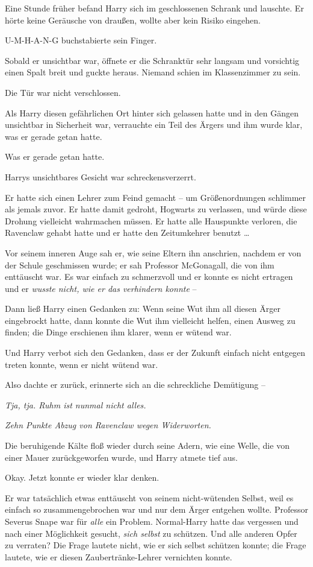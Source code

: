 Eine Stunde früher befand Harry sich im geschlossenen Schrank und lauschte. Er hörte keine Geräusche von draußen, wollte aber kein Risiko eingehen. 

U-M-H-A-N-G buchstabierte sein Finger. 

Sobald er unsichtbar war, öffnete er die Schranktür sehr langsam und vorsichtig einen Spalt breit und guckte heraus. Niemand schien im Klassenzimmer zu sein. 

Die Tür war nicht verschlossen. 

Als Harry diesen gefährlichen Ort hinter sich gelassen hatte und in den Gängen unsichtbar in Sicherheit war, verrauchte ein Teil des Ärgers und ihm wurde klar, was er gerade getan hatte. 

Was er gerade getan hatte. 

Harrys unsichtbares Gesicht war schreckensverzerrt. 

Er hatte sich einen Lehrer zum Feind gemacht – um Größenordnungen schlimmer als jemals zuvor. Er hatte damit gedroht, Hogwarts zu verlassen, und würde diese Drohung vielleicht wahrmachen müssen. Er hatte alle Hauspunkte verloren, die Ravenclaw gehabt hatte und er hatte den Zeitumkehrer benutzt … 

Vor seinem inneren Auge sah er, wie seine Eltern ihn anschrien, nachdem er von der Schule geschmissen wurde; er sah Professor McGonagall, die von ihm enttäuscht war. Es war einfach zu schmerzvoll und er konnte es nicht ertragen und er \emph{wusste nicht, wie er das verhindern konnte} – 

Dann ließ Harry einen Gedanken zu: Wenn seine Wut ihm all diesen Ärger eingebrockt hatte, dann konnte die Wut ihm vielleicht helfen, einen Ausweg zu finden; die Dinge erschienen ihm klarer, wenn er wütend war. 

Und Harry verbot sich den Gedanken, dass er der Zukunft einfach nicht entgegen treten konnte, wenn er nicht wütend war. 

Also dachte er zurück, erinnerte sich an die schreckliche Demütigung – 

\emph{Tja, tja. Ruhm ist nunmal nicht alles.}

\emph{Zehn Punkte Abzug von Ravenclaw wegen Widerworten.}

Die beruhigende Kälte floß wieder durch seine Adern, wie eine Welle, die von einer Mauer zurückgeworfen wurde, und Harry atmete tief aus. 

Okay. Jetzt konnte er wieder klar denken. 

Er war tatsächlich etwas enttäuscht von seinem nicht-wütenden Selbst, weil es einfach so zusammengebrochen war und nur dem Ärger entgehen wollte. Professor Severus Snape war für \emph{alle} ein Problem. Normal-Harry hatte das vergessen und nach einer Möglichkeit gesucht, \emph{sich selbst} zu schützen. Und alle anderen Opfer zu verraten? Die Frage lautete nicht, wie er sich selbst schützen konnte; die Frage lautete, wie er diesen Zaubertränke-Lehrer vernichten konnte. 

